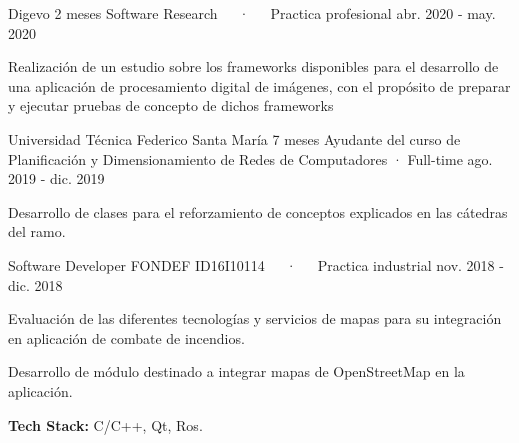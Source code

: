 

\begin{cventries}
  \cventry
    {Digevo} %
    {2 meses} %
    {Software Research~~~·~~~Practica profesional} %
    {abr. 2020 - may. 2020} %
    {
      \begin{cvitems} %
        \item {Realización de un estudio sobre los frameworks disponibles para el desarrollo de una aplicación de 
        procesamiento digital de imágenes, con el propósito de preparar y ejecutar pruebas de concepto de dichos frameworks}
      \end{cvitems}
    }

  \cvmultientry
    {Universidad Técnica Federico Santa María} %
    {7 meses}
    {Ayudante del curso de Planificación y Dimensionamiento de Redes de Computadores · Full-time} %
    {ago. 2019 - dic. 2019} %
    {
      \begin{cvitems} %
          \item {Desarrollo de clases para el reforzamiento de conceptos explicados en las cátedras del ramo.}
      \end{cvitems}
    }
    {Software Developer FONDEF ID16I10114~~~·~~~Practica industrial} %
    {nov. 2018 - dic. 2018} %
    {
      \begin{cvitems} %
        \item {Evaluación de las diferentes tecnologías y servicios de mapas para su integración en aplicación de combate de incendios.}
        \item {Desarrollo de módulo destinado a integrar mapas de OpenStreetMap en la aplicación.}
        \item {\textbf{Tech Stack:} C/C++, Qt, Ros.}
      \end{cvitems}
    }
    {}

\end{cventries}
